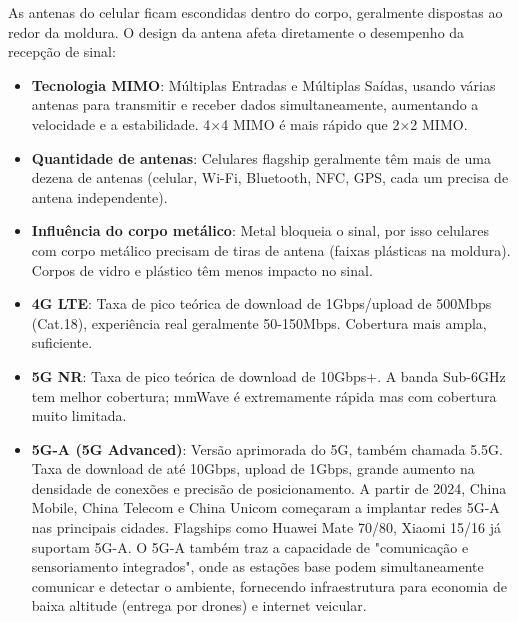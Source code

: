 
As antenas do celular ficam escondidas dentro do corpo, geralmente dispostas ao redor da moldura. O design da antena afeta diretamente o desempenho da recepção de sinal:

\begin{itemize}
  \item \textbf{Tecnologia MIMO}: Múltiplas Entradas e Múltiplas Saídas, usando várias antenas para transmitir e receber dados simultaneamente, aumentando a velocidade e a estabilidade. 4×4 MIMO é mais rápido que 2×2 MIMO.
  \item \textbf{Quantidade de antenas}: Celulares flagship geralmente têm mais de uma dezena de antenas (celular, Wi-Fi, Bluetooth, NFC, GPS, cada um precisa de antena independente).
  \item \textbf{Influência do corpo metálico}: Metal bloqueia o sinal, por isso celulares com corpo metálico precisam de tiras de antena (faixas plásticas na moldura). Corpos de vidro e plástico têm menos impacto no sinal.
\end{itemize}


\begin{itemize}
  \item \textbf{4G LTE}: Taxa de pico teórica de download de 1Gbps/upload de 500Mbps (Cat.18), experiência real geralmente 50-150Mbps. Cobertura mais ampla, suficiente.
  \item \textbf{5G NR}: Taxa de pico teórica de download de 10Gbps+. A banda Sub-6GHz tem melhor cobertura; mmWave é extremamente rápida mas com cobertura muito limitada.
  \item \textbf{5G-A (5G Advanced)}: Versão aprimorada do 5G, também chamada 5.5G. Taxa de download de até 10Gbps, upload de 1Gbps, grande aumento na densidade de conexões e precisão de posicionamento. A partir de 2024, China Mobile, China Telecom e China Unicom começaram a implantar redes 5G-A nas principais cidades. Flagships como Huawei Mate 70/80, Xiaomi 15/16 já suportam 5G-A. O 5G-A também traz a capacidade de "comunicação e sensoriamento integrados", onde as estações base podem simultaneamente comunicar e detectar o ambiente, fornecendo infraestrutura para economia de baixa altitude (entrega por drones) e internet veicular.
\end{itemize}


